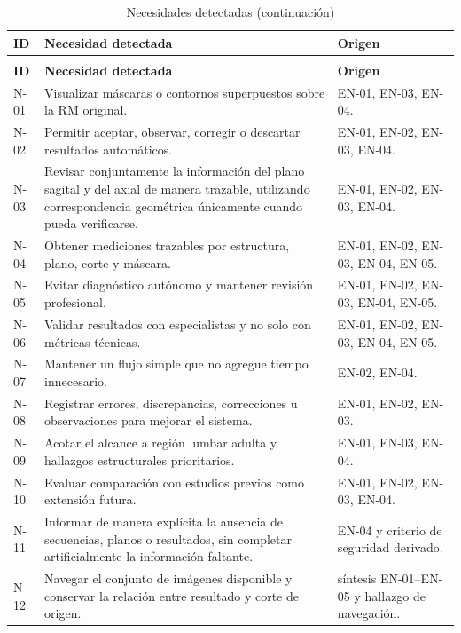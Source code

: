 {\small
\setlength{\LTleft}{0pt}
\setlength{\LTright}{0pt}
\renewcommand{\arraystretch}{1.18}
\setlength{\tabcolsep}{3pt}
\begin{longtable}{>{\raggedright\arraybackslash}p{} >{\raggedright\arraybackslash}p{} >{\raggedright\arraybackslash}p{}}
\caption{Necesidades detectadas}\label{tab:user-research-necesidades}\\
\hline
\textbf{ID} & \textbf{Necesidad detectada} & \textbf{Origen} \\
\hline
\endfirsthead
\caption[]{Necesidades detectadas (continuación)}\\
\hline
\textbf{ID} & \textbf{Necesidad detectada} & \textbf{Origen} \\
\hline
\endhead
\hline
\endfoot
N-01 & Visualizar máscaras o contornos superpuestos sobre la RM original. & EN-01, EN-03, EN-04. \\
N-02 & Permitir aceptar, observar, corregir o descartar resultados automáticos. & EN-01, EN-02, EN-03, EN-04. \\
N-03 & Revisar conjuntamente la información del plano sagital y del axial de manera trazable, utilizando correspondencia geométrica únicamente cuando pueda verificarse. & EN-01, EN-02, EN-03, EN-04. \\
N-04 & Obtener mediciones trazables por estructura, plano, corte y máscara. & EN-01, EN-02, EN-03, EN-04, EN-05. \\
N-05 & Evitar diagnóstico autónomo y mantener revisión profesional. & EN-01, EN-02, EN-03, EN-04, EN-05. \\
N-06 & Validar resultados con especialistas y no solo con métricas técnicas. & EN-01, EN-02, EN-03, EN-04, EN-05. \\
N-07 & Mantener un flujo simple que no agregue tiempo innecesario. & EN-02, EN-04. \\
N-08 & Registrar errores, discrepancias, correcciones u observaciones para mejorar el sistema. & EN-01, EN-02, EN-03. \\
N-09 & Acotar el alcance a región lumbar adulta y hallazgos estructurales prioritarios. & EN-01, EN-03, EN-04. \\
N-10 & Evaluar comparación con estudios previos como extensión futura. & EN-01, EN-02, EN-03, EN-04. \\
N-11 & Informar de manera explícita la ausencia de secuencias, planos o resultados, sin completar artificialmente la información faltante. & EN-04 y criterio de seguridad derivado. \\
N-12 & Navegar el conjunto de imágenes disponible y conservar la relación entre resultado y corte de origen. & síntesis EN-01–EN-05 y hallazgo de navegación. \\
\hline
\end{longtable}
}

